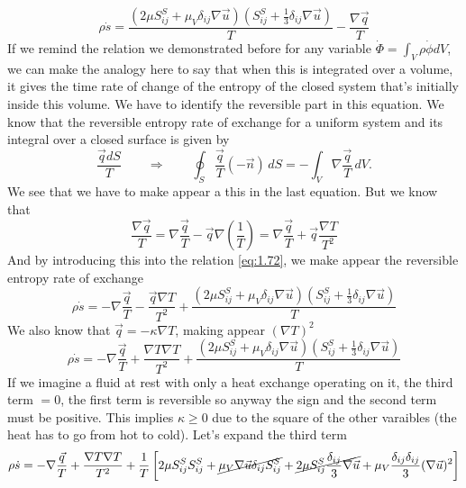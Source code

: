 	  		\begin{equation}
	  			\rho \dot{s} = \frac{(2\mu S_{ij}^S + \mu _V \delta _{ij} \nabla \vec{u})\left(S_{ij}^S + \frac{1}{3}\delta _{ij}\nabla \vec{u}\right)}{T} - \frac{\nabla \vec{q}}{T}
	  			\label{eq:1.72}
	  		\end{equation}
	  		If we remind the relation we demonstrated before for any variable $\dot{\Phi} = \int _V \rho \dot{\phi} dV$, we can make the analogy here to say that when this is integrated over a volume, it gives the time rate of change of the entropy of the closed system that's initially inside this volume. We have to identify the reversible part in this equation. We know that the reversible entropy rate of exchange for a uniform system and its integral over a closed surface is given by
	  		\begin{equation}
	  			\frac{\vec{q}dS}{T} \qquad \Rightarrow \qquad \oint _S \frac{\vec{q}}{T}(-\vec{n})\, dS = -\int _V \nabla \frac{\vec{q}}{T} \, dV.
			\end{equation}	  		 
			We see that we have to make appear a this in the last equation. But we know that
			\begin{equation}
				\frac{\nabla \vec{q}}{T} = \nabla \frac{\vec{q}}{T} - \vec{q} \nabla \left(\frac{1}{T} \right) = \nabla \frac{\vec{q}}{T} + \vec{q} \frac{\nabla T}{T^2}
			\end{equation}
			And by introducing this into the relation \eqref{eq:1.72}, we make appear the reversible entropy rate of exchange
			\begin{equation}
				\rho \dot{s} = -\nabla \frac{\vec{q}}{T} - \frac{\vec{q}\nabla T}{T^2} + \frac{(2\mu S_{ij}^S + \mu _V \delta _{ij} \nabla \vec{u})\left(S_{ij}^S + \frac{1}{3}\delta _{ij}\nabla \vec{u}\right)}{T}
			\end{equation}
			We also know that $\vec{q} = -\kappa \nabla T$, making appear $(\nabla T)^2$
			\begin{equation}
				\rho \dot{s} = -\nabla \frac{\vec{q}}{T} + \frac{\nabla T\nabla T}{T^2} + \frac{(2\mu S_{ij}^S + \mu _V \delta _{ij} \nabla \vec{u})\left(S_{ij}^S + \frac{1}{3}\delta _{ij}\nabla \vec{u}\right)}{T}
			\end{equation}
			If we imagine a fluid at rest with only a heat exchange operating on it, the third term $=0$, the first term is reversible so anyway the sign and the second term must be positive. This implies $\kappa \geq 0$ due to the square of the other varaibles (the heat has to go from hot to cold). Let's expand the third term
			\begin{equation}
				\rho \dot{s} = -\nabla \frac{\vec{q}}{T} + \frac{\nabla T\nabla T}{T^2} + \frac{1}{T}\left[ 2\mu S_{ij}^S S_{ij}^S + \cancel{\mu _V \nabla \vec{u} \delta _{ij} S_{ij}^S} + \cancel{2\mu S_{ij}^S \frac{\delta _{ij}}{3} \nabla \vec{u}} + \mu _V \frac{\delta _{ij}\delta _{ij}}{3}(\nabla \vec{u})^2  \right]			
			\end{equation}			 
